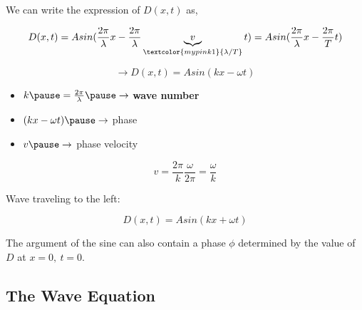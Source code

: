 \documentclass[]{beamer}
\begin{document}
\begin{frame}


We can write the expression of $D(x,t) $ as,

\pause

\begin{equation}
D(x,t)=Asin(\frac{2\pi}{\lambda}x-\frac{2\pi}{\lambda}\underbrace{v}_{\textcolor{mypink1}{\lambda/T}}t)=Asin(\frac{2\pi}{\lambda}x-\frac{2\pi}{T}t)
\end{equation}



\pause


\begin{equation}
\rightarrow D(x,t)=Asin(kx-\omega t)
\end{equation}

\pause

\begin{itemize}
  \item \textcolor{mypink1}{$k\pause=\frac{2\pi}{\lambda}\pause\rightarrow$  \textbf{wave number}}\pause
  \item \textcolor{mypink1}{$(kx-\omega t) \pause\rightarrow$ phase }\pause
  \item \textcolor{mypink1}{$v \pause\rightarrow$ phase velocity}
\end{itemize}



\pause
\begin{equation}
\boxed{v=\frac{2\pi}{k}\frac{\omega}{2\pi}=\frac{\omega}{k}}
\end{equation}

  \end{frame}


\begin{frame}


Wave traveling to the left:

\pause

\begin{equation}
D(x,t)=Asin(kx+\omega t)
\end{equation}

\pause

The argument of the sine can also contain a phase $\phi$ determined by the value of $D$ at $x=0,~t=0$.
  \end{frame}


\subsection{The Wave Equation}
\end{document}
